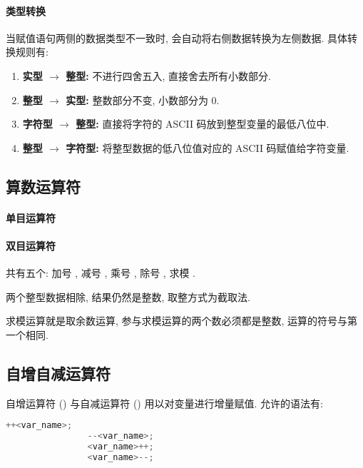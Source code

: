         \paragraph{类型转换}
            \hspace*{2em} 当赋值语句两侧的数据类型不一致时, 会自动将右侧数据转换为左侧数据. 具体转换规则有:
                \begin{enumerate}
                    \item \textbf{实型 $\to$ 整型:} 不进行四舍五入, 直接舍去所有小数部分.
                    \item \textbf{整型 $\to$ 实型:} 整数部分不变, 小数部分为 0.
                    \item \textbf{字符型 $\to$ 整型:} 直接将字符的 ASCII 码放到整型变量的最低八位中.
                    \item \textbf{整型 $\to$ 字符型:} 将整型数据的低八位值对应的 ASCII 码赋值给字符变量.
                \end{enumerate}

    \subsection{算数运算符}
        \paragraph{单目运算符}

        \paragraph{双目运算符}
            \hspace*{2em} 共有五个: 加号 \Code{+}, 减号 \Code{-}, 乘号 \Code{*}, 除号 \Code{/}, 求模 \Code{\%}.

            \begin{Notation}
                \item 两个整型数据相除, 结果仍然是整数, 取整方式为截取法.
                \item 求模运算就是取余数运算, 参与求模运算的两个数必须都是整数, 运算的符号与第一个相同.
            \end{Notation}

    \subsection{自增自减运算符}
        自增运算符 (\Code{++}) 与自减运算符 (\Code{--}) 用以对变量进行增量赋值. 允许的语法有:
            \begin{lstlisting}[language = {C}, gobble = 16]
                ++<var_name>;
                --<var_name>;
                <var_name>++;
                <var_name>--;
            \end{lstlisting}

